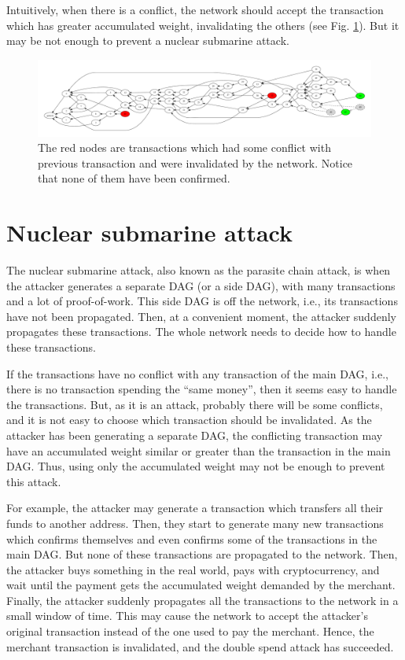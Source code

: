 Intuitively, when there is a conflict, the network should accept the transaction which has greater accumulated weight, invalidating the others (see Fig. \ref{fig-tangle-conflict}). But it may be not enough to prevent a nuclear submarine attack.

\begin{figure}[ht]
\centering\includegraphics[width=\textwidth]{./images01/fig-tangle-conflict.pdf}
\caption{The red nodes are transactions which had some conflict with previous transaction and were invalidated by the network. Notice that none of them have been confirmed.\label{fig-tangle-conflict}}
\end{figure}

\section{Nuclear submarine attack}

The nuclear submarine attack, also known as the parasite chain attack, is when the attacker generates a separate DAG (or a side DAG), with many transactions and a lot of proof-of-work. This side DAG is off the network, i.e., its transactions have not been propagated. Then, at a convenient moment, the attacker suddenly propagates these transactions. The whole network needs to decide how to handle these transactions.

If the transactions have no conflict with any transaction of the main DAG, i.e., there is no transaction spending the ``same money'', then it seems easy to handle the transactions. But, as it is an attack, probably there will be some conflicts, and it is not easy to choose which transaction should be invalidated. As the attacker has been generating a separate DAG, the conflicting transaction may have an accumulated weight similar or greater than the transaction in the main DAG. Thus, using only the accumulated weight may not be enough to prevent this attack.

For example, the attacker may generate a transaction which transfers all their funds to another address. Then, they start to generate many new transactions which confirms themselves and even confirms some of the transactions in the main DAG. But none of these transactions are propagated to the network. Then, the attacker buys something in the real world, pays with cryptocurrency, and wait until the payment gets the accumulated weight demanded by the merchant. Finally, the attacker suddenly propagates all the transactions to the network in a small window of time. This may cause the network to accept the attacker's original transaction instead of the one used to pay the merchant. Hence, the merchant transaction is invalidated, and the double spend attack has succeeded.

